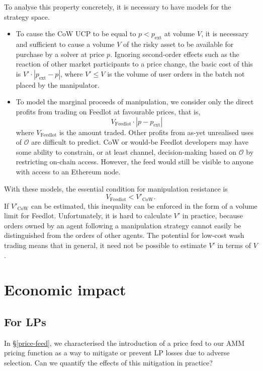 \documentclass[a4paper,10pt]{article}
\theoremstyle{remark}
\newcommand \oracle {\mathcal{O}}
\begin{document}
To analyse this property concretely, it is necessary to have models for the strategy space.
\begin{itemize}
  \item 
    To cause the CoW UCP to be equal to $p<p_\mathrm{ext}$ at volume $V$, it is necessary and sufficient to cause a volume $V$ of the risky asset to be available for purchase by a solver at price $p$.
    Ignoring second-order effects such as the reaction of other market participants to a price change, the basic cost of this is $V'\cdot |p_\mathrm{ext}-p|$, where $V'\leq V$ is the volume of user orders in the batch not placed by the manipulator.
    
  \item 
    To model the marginal proceeds of manipulation, we consider only the direct profits from trading on Feedlot at favourable prices, that is,
    \[
      V_\mathrm{Feedlot}\cdot\left|p-p_\mathrm{ext}\right|
    \]
    where $V_\mathrm{Feedlot}$ is the amount traded.
    Other profits from as-yet unrealised uses of $\oracle$ are difficult to predict.
    CoW or would-be Feedlot developers may have some ability to constrain, or at least channel, decision-making based on $\oracle$ by restricting on-chain access.
    However, the feed would still be visible to anyone with access to an Ethereum node.
    
\end{itemize}
With these models, the essential condition for manipulation resistance is
\[
  V_\mathrm{Feedlot} < V'_\mathrm{CoW}.
\]
If $V'_\mathrm{CoW}$ can be estimated, this inequality can be enforced in the form of a volume limit for Feedlot.
%
Unfortunately, it is hard to calculate $V'$ in practice, because orders owned by an agent following a manipulation strategy cannot easily be distinguished from the orders of other agents.
%
The potential for low-cost wash trading means that in general, it need not be possible to estimate $V'$ in terms of $V$.

\section{Economic impact}

\subsection{For LPs}
In \S\ref{price-feed}, we characterised the introduction of a price feed to our AMM pricing function as a way to mitigate or prevent LP losses due to adverse selection.
%
Can we quantify the effects of this mitigation in practice?
\end{document}
